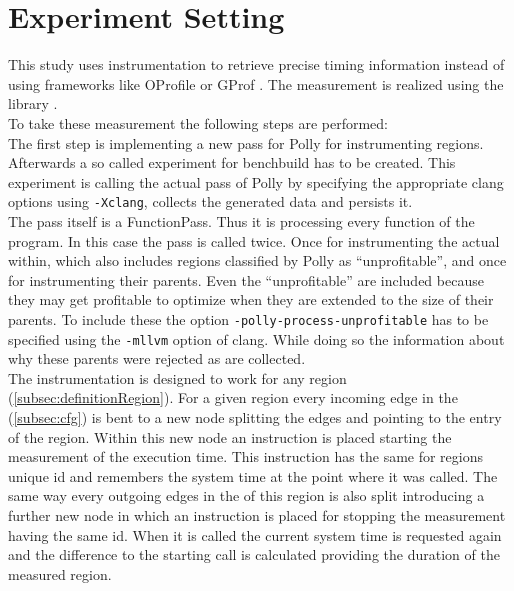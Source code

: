 \section{Experiment Setting}\label{sec:experimentSettings}
\begin{sloppypar}
    This study uses instrumentation to retrieve precise timing information instead of using frameworks like OProfile \cite{oprofile} or GProf \cite{gprof}.
    The measurement is realized using the \papi library \cite{papi}.\\
    To take these measurement the following steps are performed:\\
    The first step is implementing a new pass for Polly for instrumenting regions.
    Afterwards a so called experiment for benchbuild \cite{benchbuild} has to be created.
    This experiment is calling the actual pass of Polly by specifying the appropriate clang options using \texttt{-Xclang}, collects the generated data and persists it.\\
    The pass itself is a FunctionPass.
    Thus it is processing every function of the program.
    In this case the pass is called twice.
    Once for instrumenting the actual \scops within, which also includes regions classified by Polly as \enquote{unprofitable}, and once for instrumenting their parents.
    Even the \enquote{unprofitable} \scops are included because they may get profitable to optimize when they are extended to the size of their parents.
    To include these \scops the option \texttt{-polly-process-unprofitable} has to be specified using the \texttt{-mllvm} option of clang.
    While doing so the information about why these parents were rejected as \scops are collected.\\
    The instrumentation is designed to work for any region (\autoref{subsec:definitionRegion}).
    For a given region every incoming edge in the \cfg (\autoref{subsec:cfg}) is bent to a new node splitting the edges and pointing to the entry of the region.
    Within this new node an instruction is placed starting the measurement of the execution time.
    This instruction has the same for regions unique id and remembers the system time at the point where it was called.
    The same way every outgoing edges in the \cfg of this region is also split introducing a further new node in which an instruction is placed for stopping the measurement having the same id.
    When it is called the current system time is requested again and the difference to the starting call is calculated providing the duration of the measured region.

\end{sloppypar}
